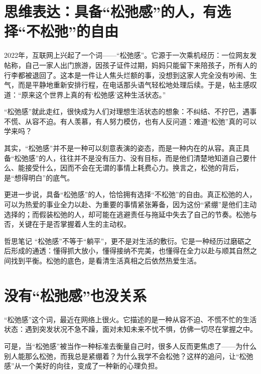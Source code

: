
\section*{思维表达：具备“松弛感”的人，有选择“不松弛”的自由}

2022年，互联网上兴起了一个词——“松弛感”。它源于一次乘机经历：一位网友发帖称，自己一家人出门旅游，因孩子证件过期，妈妈只能留下来陪孩子，所有人的行李都被退回了。这本是一件让人焦头烂额的事，没想到这家人完全没有吵闹、生气，而是平静地重新安排行程，在电话那头语气轻松地处理后续。于是，帖主感叹道：“原来这个世界上真的有‘松弛感’这种生活状态。”

“松弛感”就此走红，很快成为人们对理想生活状态的想象：不纠结、不拧巴，遇事不慌、从容不迫。有人羡慕，有人努力模仿，也有人反问道：难道“松弛”真的可以学来吗？

其实，“松弛感”并不是一种可以刻意表演的姿态，而是一种内在的从容。真正具备“松弛感”的人，往往并不是没有压力、没有目标，而是他们清楚地知道自己要什么、能接受什么，因而不会在无谓的事情上耗费心力。换言之，松弛的背后，是“想得明白”的底气。

更进一步说，具备“松弛感”的人，恰恰拥有选择“不松弛”的自由。真正松弛的人，可以为热爱的事业全力以赴、为重要的事情紧张筹备，因为这份“紧绷”是他们主动选择的；而假装松弛的人，却可能在逃避责任与拖延中失去了自己的节奏。松弛与否，关键在于是否掌握着人生的主动权。

\begin{quoteBox}{哲思笔记}
“松弛感”不等于“躺平”，更不是对生活的敷衍。它是一种经历过磨砺之后形成的通透：懂得抓大放小，懂得接纳不完美，也懂得在全力以赴与顺其自然之间找到平衡。松弛的底色，是看清生活真相之后依然热爱生活。
\end{quoteBox}

\clearpage
\section*{没有“松弛感”也没关系}

“松弛感”这个词，最近在网络上很火。它描述的是一种从容不迫、不慌不忙的生活状态：遇到突发状况不急不躁，面对未知未来不忧不惧，仿佛一切尽在掌握之中。

可是，当“松弛感”被当作一种标准去衡量自己时，很多人反而更焦虑了——为什么别人能那么松弛，而我总是紧绷着？为什么我学不会松弛？这样的追问，让“松弛感”从一个美好的向往，变成了一种新的心理负担。

